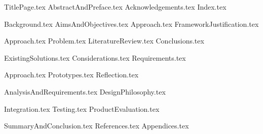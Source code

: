 \documentclass{article} %
\begin{document}

{TitlePage.tex}
{AbstractAndPreface.tex}
{Acknowledgements.tex}
{Index.tex}

\newpage
{Background.tex}
{AimsAndObjectives.tex}
{Approach.tex}
{FrameworkJustification.tex}

\newpage
{Approach.tex}
{Problem.tex}
{LiteratureReview.tex}
{Conclusions.tex}

\newpage
{ExistingSolutions.tex}
{Considerations.tex}
{Requirements.tex}

\newpage
{Approach.tex}
{Prototypes.tex}
{Reflection.tex}

\newpage
{AnalysisAndRequirements.tex}
{DesignPhilosophy.tex}

\newpage
{Integration.tex}
{Testing.tex}
{ProductEvaluation.tex}

\newpage
{SummaryAndConclusion.tex}
{References.tex}
{Appendices.tex}
\end{document}
